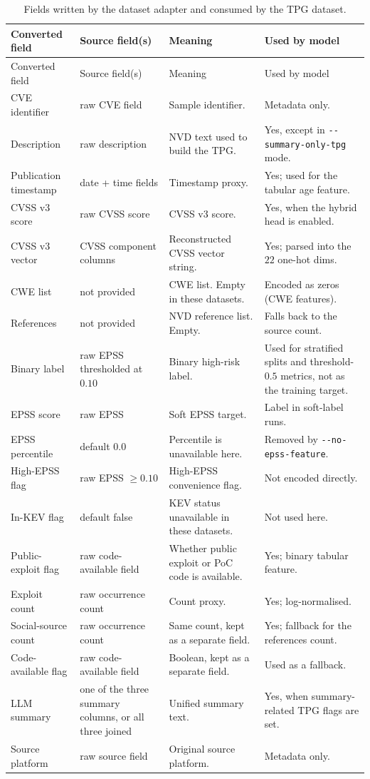 \documentclass[11pt]{article}
\begin{document}
\small
\begin{longtable}{p{}p{}p{}p{}}
\caption{Fields written by the dataset adapter and consumed by the
TPG dataset.}\\
\toprule
Converted field & Source field(s) & Meaning & Used by model \\
\midrule
\endfirsthead
\toprule
Converted field & Source field(s) & Meaning & Used by model \\
\midrule
\endhead
\bottomrule
\endfoot

CVE identifier & raw CVE field & Sample identifier. & Metadata only. \\
Description & raw description & NVD text used to build the TPG. & Yes, except in \verb|--summary-only-tpg| mode. \\
Publication timestamp & date + time fields & Timestamp proxy. & Yes; used for the tabular age feature. \\
CVSS v3 score & raw CVSS score & CVSS v3 score. & Yes, when the hybrid head is enabled. \\
CVSS v3 vector & CVSS component columns & Reconstructed CVSS vector string. & Yes; parsed into the $22$ one-hot dims. \\
CWE list & not provided & CWE list. Empty in these datasets. & Encoded as zeros (CWE features). \\
References & not provided & NVD reference list. Empty. & Falls back to the source count. \\
Binary label & raw EPSS thresholded at $0.10$ & Binary high-risk label. & Used for stratified splits and threshold-$0.5$ metrics, not as the training target. \\
EPSS score & raw EPSS & Soft EPSS target. & Label in soft-label runs. \\
EPSS percentile & default $0.0$ & Percentile is unavailable here. & Removed by \verb|--no-epss-feature|. \\
High-EPSS flag & raw EPSS $\geq 0.10$ & High-EPSS convenience flag. & Not encoded directly. \\
In-KEV flag & default false & KEV status unavailable in these datasets. & Not used here. \\
Public-exploit flag & raw code-available field & Whether public exploit or PoC code is available. & Yes; binary tabular feature. \\
Exploit count & raw occurrence count & Count proxy. & Yes; log-normalised. \\
Social-source count & raw occurrence count & Same count, kept as a separate field. & Yes; fallback for the references count. \\
Code-available flag & raw code-available field & Boolean, kept as a separate field. & Used as a fallback. \\
LLM summary & one of the three summary columns, or all three joined & Unified summary text. & Yes, when summary-related TPG flags are set. \\
Source platform & raw source field & Original source platform. & Metadata only. \\

\end{longtable}
\normalsize
\end{document}

